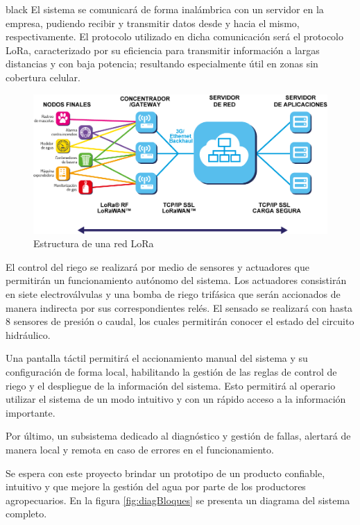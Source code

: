 \documentclass[11pt]{charter}
\begin{document}
\begin{consigna}{black}
El sistema se comunicará de forma inalámbrica con un servidor en la empresa, pudiendo recibir  y transmitir datos desde y hacia el mismo, respectivamente. El protocolo utilizado en dicha comunicación será el protocolo LoRa, caracterizado por su eficiencia para transmitir información a largas distancias y con baja potencia; resultando especialmente útil en zonas sin cobertura celular.

\begin{figure}[htpb]
\centering 
\includegraphics[width=.7\textwidth]{./Figuras/redLora.png}
\caption{Estructura de una red LoRa}
\label{fig:redLoRa}
\end{figure}

El control del riego se realizará por medio de sensores y actuadores que permitirán un funcionamiento autónomo del sistema. Los actuadores consistirán en siete electroválvulas y una bomba de riego trifásica que serán accionados de manera indirecta por sus correspondientes relés. El sensado se realizará con hasta 8 sensores de presión o caudal, los cuales permitirán conocer el estado del circuito hidráulico.

Una pantalla táctil permitirá el accionamiento manual del sistema y su configuración de forma local, habilitando la gestión de las reglas de control de riego y el despliegue de la información del sistema. Esto permitirá al operario utilizar el sistema de un modo intuitivo y con un rápido acceso a la información importante.

Por último, un subsistema dedicado al diagnóstico y gestión de fallas, alertará de manera local y remota en caso de errores en el funcionamiento.

Se espera con este proyecto brindar un prototipo de un producto confiable, intuitivo y que mejore la gestión del agua por parte de los productores agropecuarios. En la figura \ref{fig:diagBloques} se presenta un diagrama del sistema completo.


\vspace{25px}


\end{consigna}
\end{document}
